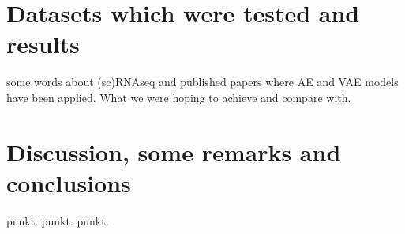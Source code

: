 \documentclass[11pt, a4paper]{report}
\theoremstyle{plain}
\theoremstyle{definition}
\theoremstyle{remark}
\begin{document}
\chapter{Datasets which were tested and results}
some words about (sc)RNAseq and published papers where 
AE and VAE models have been applied.
What we were hoping to achieve and compare with.

\chapter{Discussion, some remarks and conclusions}
punkt.
punkt.
punkt.







\printbibliography
\end{document}
